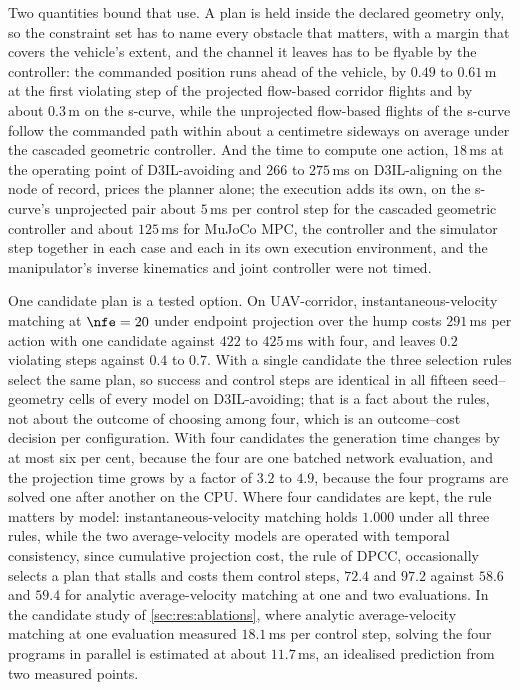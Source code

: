 Two quantities bound that use. A plan is held inside the declared geometry only, so the constraint set
has to name every obstacle that matters, with a margin that covers the vehicle's extent, and the
channel it leaves has to be flyable by the controller: the commanded position runs ahead of the
vehicle, by $0.49$ to $0.61$\,m at the first violating step of the projected flow-based corridor
flights and by about $0.3$\,m on the s-curve, while the unprojected flow-based flights of the s-curve
follow the commanded path within about a centimetre sideways on average under the cascaded geometric
controller. And the time to compute one action, $18$\,ms at
the operating point of D3IL-avoiding and $266$ to $275$\,ms on D3IL-aligning on the node of record,
prices the planner alone; the execution adds its own, on the s-curve's unprojected pair about
$5$\,ms per control step for the cascaded geometric controller and about $125$\,ms for MuJoCo MPC,
the controller and the simulator step together in each case and each in its own execution
environment, and the manipulator's inverse kinematics and joint controller were not timed. 

One candidate plan is a tested option. On UAV-corridor, instantaneous-velocity matching at $\nfe = 20$
under endpoint projection over the hump costs $291$\,ms per action with one candidate against $422$
to $425$\,ms with four, and leaves $0.2$ violating steps against $0.4$ to $0.7$. With a single
candidate the three selection rules select the same plan, so success and control steps are identical
in all fifteen seed--geometry cells of every model on D3IL-avoiding; that is a fact about the rules,
not about the outcome of choosing among four, which is an outcome--cost decision per configuration.
With four candidates the generation time changes by at most six per cent, because the four are one
batched network evaluation, and the projection time grows by a factor of $3.2$ to $4.9$, because the
four programs are solved one after another on the CPU. Where four candidates are kept, the rule
matters by model: instantaneous-velocity matching holds $1.000$ under all three rules, while the two
average-velocity models are operated with temporal consistency, since cumulative projection cost, the
rule of \ac{DPCC}, occasionally selects a plan that stalls and costs them control steps, $72.4$ and
$97.2$ against $58.6$ and $59.4$ for analytic average-velocity matching at one and two evaluations.
In the candidate study of \autoref{sec:res:ablations}, where analytic average-velocity matching at one
evaluation measured $18.1$\,ms per control step, solving the four programs in parallel is estimated
at about $11.7$\,ms, an idealised prediction from two measured points.

